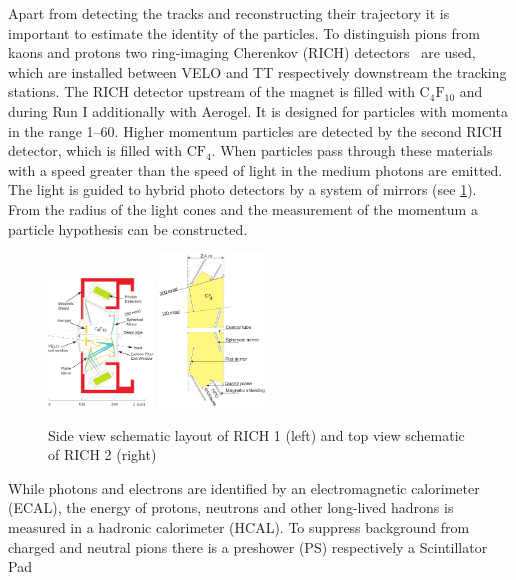 Apart from detecting the tracks and reconstructing their trajectory it is
important to estimate the identity of the particles. To distinguish pions from
kaons and protons two ring-imaging Cherenkov (RICH)
detectors~\cite{LHCb-DP-2012-003} are used, which are installed between VELO
and TT respectively downstream the tracking stations. The RICH detector
upstream of the magnet is filled with $\mathrm{C_4F_{10}}$ and during Run I
additionally with Aerogel. It is designed for particles with momenta in the
range \SIrange{1}{60}{\gevc}. Higher momentum particles are detected by the
second RICH detector, which is filled with $\mathrm{CF_4}$. When particles
pass through these materials with a speed greater than the speed of light in
the medium photons are emitted. The light is guided to hybrid photo detectors
by a system of mirrors (see \cref{fig:detector:rich}). From the radius of the
light cones and the measurement of the momentum a particle hypothesis can be
constructed.
\begin{figure}[htb]
\centering
\includegraphics[width=0.25\textwidth]{04-Detector/figs/rich1-2d.pdf}
\includegraphics[width=0.25\textwidth]{04-Detector/figs/rich2_schematic.pdf}
\caption{Side view schematic layout of RICH 1 (left) and top view schematic of
RICH 2 (right)~\cite{Alves:2008zz}}
\label{fig:detector:rich}
\end{figure}
While photons and electrons are identified by an electromagnetic calorimeter
(ECAL), the energy of protons, neutrons and other long-lived hadrons is
measured in a hadronic calorimeter (HCAL). To suppress background from charged
and neutral pions there is a preshower (PS) respectively a Scintillator Pad
